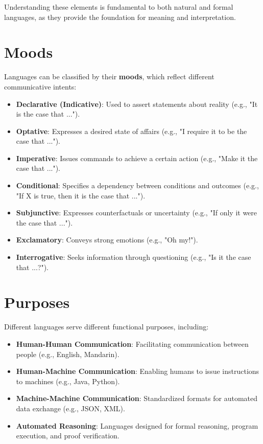 \documentclass{book}
\providecommand{\tightlist}{%
  \setlength{\itemsep}{0pt}\setlength{\parskip}{0pt}}
\begin{document}
Understanding these elements is fundamental to both natural and formal languages, as they provide the foundation for meaning and interpretation.

\hypertarget{pandoc.profile.debug__pandoc__debug__src__languages.md__moods}{%
\section*{Moods}\label{pandoc.profile.debug__pandoc__debug__src__languages.md__moods}}

Languages can be classified by their \textbf{moods}, which reflect different communicative intents:

\begin{itemize}
\tightlist
\item
  \textbf{Declarative (Indicative)}: Used to assert statements about reality (e.g., "It is the case that ...").
\item
  \textbf{Optative}: Expresses a desired state of affairs (e.g., "I require it to be the case that ...").
\item
  \textbf{Imperative}: Issues commands to achieve a certain action (e.g., "Make it the case that ...").
\item
  \textbf{Conditional}: Specifies a dependency between conditions and outcomes (e.g., "If X is true, then it is the case that ...").
\item
  \textbf{Subjunctive}: Expresses counterfactuals or uncertainty (e.g., "If only it were the case that ...").
\item
  \textbf{Exclamatory}: Conveys strong emotions (e.g., "Oh my!").
\item
  \textbf{Interrogative}: Seeks information through questioning (e.g., "Is it the case that ...?").
\end{itemize}

\hypertarget{pandoc.profile.debug__pandoc__debug__src__languages.md__purposes}{%
\section*{Purposes}\label{pandoc.profile.debug__pandoc__debug__src__languages.md__purposes}}

Different languages serve different functional purposes, including:

\begin{itemize}
\tightlist
\item
  \textbf{Human-Human Communication}: Facilitating communication between people (e.g., English, Mandarin).
\item
  \textbf{Human-Machine Communication}: Enabling humans to issue instructions to machines (e.g., Java, Python).
\item
  \textbf{Machine-Machine Communication}: Standardized formats for automated data exchange (e.g., JSON, XML).
\item
  \textbf{Automated Reasoning}: Languages designed for formal reasoning, program execution, and proof verification.
\end{itemize}
\end{document}
